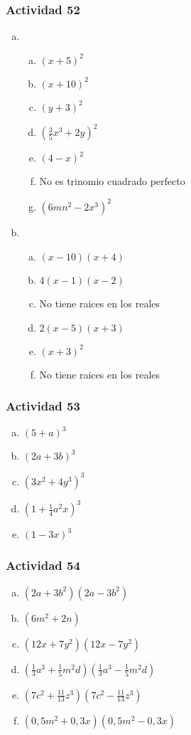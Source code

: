 \documentclass[a4paper, twocolumn]{article}
\begin{document}
\subsubsection*{Actividad 52}
\begin{enumerate}[a)]
\item \begin{enumerate}[a)]
	\item $(x+5)^2$
	\item $(x+10)^2$
	\item $(y+3)^2$
	\item $(\frac{3}{5}x^3+2y)^2$
	\item $(4-x)^2$
	\item No es trinomio cuadrado perfecto
	\item $(6mn^2 -2x^3)^2$
	\end{enumerate}
\item \begin{enumerate}[a)]
	\item $(x-10)(x+4)$
	\item $4(x-1)(x-2)$
	\item No tiene raices en los reales
	\item $2(x-5)(x+3)$
	\item $(x+3)^2$
	\item No tiene raices en los reales
	\end{enumerate}
\end{enumerate}

\subsubsection*{Actividad 53}
\begin{enumerate}[a)]
\item $(5+a)^3$
\item $(2a+3b)^3$
\item $(3x^2+4y^3)^3$
\item $(1+\frac{1}{4}a^2x)^3$
\item $(1-3x)^3$


\end{enumerate}

\subsubsection*{Actividad 54}
\begin{enumerate}[a)]
\item $(2a+3b^2)(2a-3b^2)$
\item $(6m^2+2n)$
\item $(12x+7y^2)(12x-7y^2)$
\item $(\frac{1}{3} a^3 + \frac{1}{5} m^2 d)(\frac{1}{3} a^3 - \frac{1}{5} m^2 d)$
\item $(7c^2+\frac{11}{13}z^3)(7c^2-\frac{11}{13}z^3)$
\item $(0,5m^2+0,3x)(0,5m^2-0,3x)$
\end{enumerate}
\end{document}

